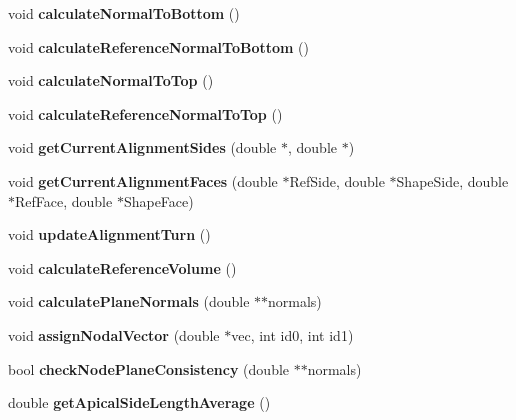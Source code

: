 \begin{DoxyCompactItemize}
\item 
\hypertarget{classPrism_a872ce1e6304b1400d2d0e712af2a0131}{}void {\bfseries calculate\+Normal\+To\+Bottom} ()\label{classPrism_a872ce1e6304b1400d2d0e712af2a0131}

\item 
\hypertarget{classPrism_a2d8821dcd96009c95f06f34ee23ede7e}{}void {\bfseries calculate\+Reference\+Normal\+To\+Bottom} ()\label{classPrism_a2d8821dcd96009c95f06f34ee23ede7e}

\item 
\hypertarget{classPrism_ac3b85296d366eb4dd67406228c519caf}{}void {\bfseries calculate\+Normal\+To\+Top} ()\label{classPrism_ac3b85296d366eb4dd67406228c519caf}

\item 
\hypertarget{classPrism_a41a101de7bb2f75c5f9b44de23187593}{}void {\bfseries calculate\+Reference\+Normal\+To\+Top} ()\label{classPrism_a41a101de7bb2f75c5f9b44de23187593}

\item 
\hypertarget{classPrism_a6144314003601a688d81b0389ea1114e}{}void {\bfseries get\+Current\+Alignment\+Sides} (double $\ast$, double $\ast$)\label{classPrism_a6144314003601a688d81b0389ea1114e}

\item 
\hypertarget{classPrism_ab5fa417d944a6903b5bc9d2f53d4616a}{}void {\bfseries get\+Current\+Alignment\+Faces} (double $\ast$Ref\+Side, double $\ast$Shape\+Side, double $\ast$Ref\+Face, double $\ast$Shape\+Face)\label{classPrism_ab5fa417d944a6903b5bc9d2f53d4616a}

\item 
\hypertarget{classPrism_a4472375144e5e38a912af1fb4e2cc2d1}{}void {\bfseries update\+Alignment\+Turn} ()\label{classPrism_a4472375144e5e38a912af1fb4e2cc2d1}

\item 
\hypertarget{classPrism_a4ea58fd729a2bbef20530200978a8f75}{}void {\bfseries calculate\+Reference\+Volume} ()\label{classPrism_a4ea58fd729a2bbef20530200978a8f75}

\item 
\hypertarget{classPrism_a6b273d198e94039758a027b0dfb2c8af}{}void {\bfseries calculate\+Plane\+Normals} (double $\ast$$\ast$normals)\label{classPrism_a6b273d198e94039758a027b0dfb2c8af}

\item 
\hypertarget{classPrism_a13de4e8cefb58b3a33de4c2f7265a3b0}{}void {\bfseries assign\+Nodal\+Vector} (double $\ast$vec, int id0, int id1)\label{classPrism_a13de4e8cefb58b3a33de4c2f7265a3b0}

\item 
\hypertarget{classPrism_ac9695169749356654e847a022ce29aff}{}bool {\bfseries check\+Node\+Plane\+Consistency} (double $\ast$$\ast$normals)\label{classPrism_ac9695169749356654e847a022ce29aff}

\item 
\hypertarget{classPrism_acc59ccf5e1b5f459a8fb871c2a78fe8e}{}double {\bfseries get\+Apical\+Side\+Length\+Average} ()\label{classPrism_acc59ccf5e1b5f459a8fb871c2a78fe8e}

\end{DoxyCompactItemize}
